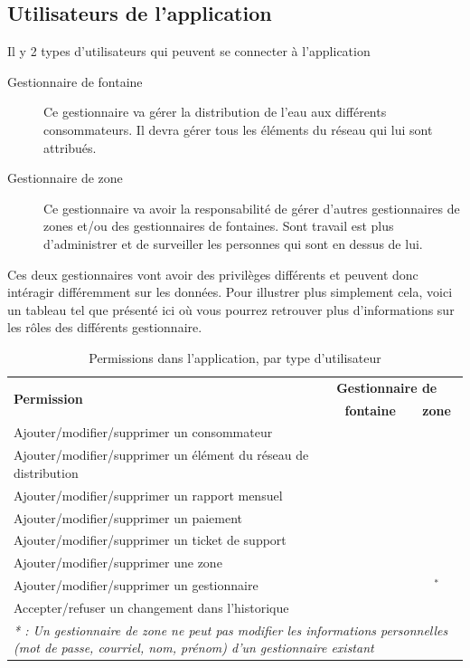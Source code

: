 \documentclass{EPL-master-thesis-covers-FR}
\newcommand{\cmark}{\ding{51}}%
\newcommand{\xmark}{\ding{55}}%
\begin{document}
			\subsection{Utilisateurs de l'application}
				Il y 2 types d'utilisateurs qui peuvent se connecter à l'application
				
				\begin{description}
					\item[Gestionnaire de fontaine] Ce gestionnaire va gérer la distribution de l'eau aux différents consommateurs. Il devra gérer tous les éléments du réseau qui lui sont attribués.
					\item[Gestionnaire de zone] Ce gestionnaire va avoir la responsabilité de gérer d'autres gestionnaires de zones et/ou des gestionnaires de fontaines. Sont travail est plus d'administrer et de surveiller les personnes qui sont en dessus de lui.			 
				\end{description}
				
				Ces deux gestionnaires vont avoir des privilèges différents et peuvent donc intéragir différemment sur les données. Pour illustrer plus simplement cela, voici un tableau tel que présenté ici \cite{ref:haitiwater} où vous pourrez retrouver plus d'informations sur les rôles des différents gestionnaire. 
				\begin{table}[H]
					\centering
					\small
					\setlength\tabcolsep{2pt}
					\begin{tabular}{|l|c|c|}
						\hline
						\multirow{2}{*}{\textbf{Permission}} & \multicolumn{2}{l|}{\textbf{Gestionnaire de}} \\ \cline{2-3}
						 & \textbf{fontaine} & \textbf{zone} \\ \hline
						 Ajouter/modifier/supprimer un consommateur & \cmark & \cmark \\ \hline
						 Ajouter/modifier/supprimer un élément du réseau de distribution & \cmark & \cmark \\ \hline
						 Ajouter/modifier/supprimer un rapport mensuel & \cmark & \cmark \\ \hline
						 Ajouter/modifier/supprimer un paiement & \cmark & \cmark \\ \hline
						 Ajouter/modifier/supprimer un ticket de support & \cmark & \cmark \\ \hline
						 Ajouter/modifier/supprimer une zone & \xmark & \cmark \\ \hline
						 Ajouter/modifier/supprimer un gestionnaire & \xmark & \cmark$^{*}$ \\ \hline
						 Accepter/refuser un changement dans l'historique & \xmark & \cmark \\ \hline
						 \multicolumn{3}{p{\textwidth}}{\emph{* : Un gestionnaire de zone ne peut pas modifier les informations personnelles (mot de passe, courriel, nom, prénom) d'un gestionnaire existant}} \\
					\end{tabular}
					\caption{Permissions dans l'application, par type d'utilisateur}
					\label{tab:permissions}
				\end{table}
				
\end{document}

